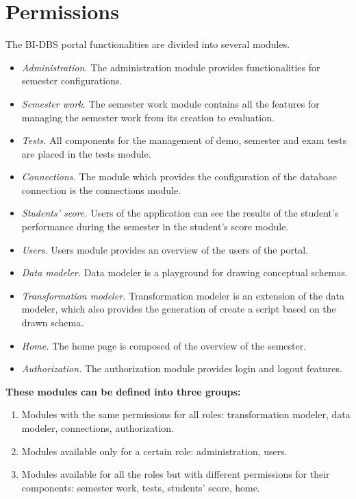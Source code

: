 \section{Permissions} The BI-DBS portal functionalities are divided into several modules.

\begin{itemize}
    \item \emph{Administration.} The administration module provides functionalities for semester configurations. 
    \item \emph{Semester work.} The semester work module contains all the features for managing the semester work from its creation to evaluation.
    \item \emph{Tests.} All components for the management of demo, semester and exam tests are placed in the tests module.
    \item \emph{Connections.} The module which provides the configuration of the database connection is the connections module.
    \item \emph{Students' score.} Users of the application can see the results of the student's performance during the semester in the student's score module.
    \item \emph{Users.} Users module provides an overview of the users of the portal.
    \item \emph{Data modeler.} Data modeler is a playground for drawing conceptual schemas.
    \item \emph{Transformation modeler.} Transformation modeler is an extension of the data modeler, which also provides the generation of create a script based on the drawn schema.
    \item \emph{Home.} The home page is composed of the overview of the semester.
    \item \emph{Authorization.} The authorization module provides login and logout features.

\end{itemize}

\vspace{0.4cm}

\noindent \textbf{These modules can be defined into three groups:}

\begin{enumerate}
    \item Modules with the same permissions for all roles: transformation modeler, data modeler, connections, authorization.
    \item Modules available only for a certain role: administration, users.
    \item Modules available for all the roles but with different permissions for their components: semester work, tests, students' score, home.
\end{enumerate}

